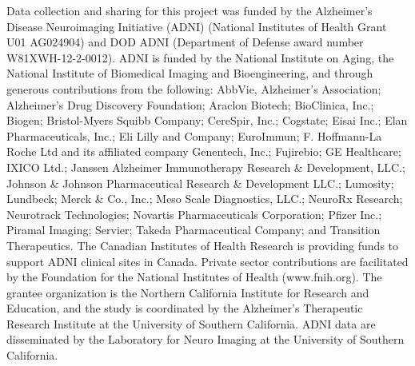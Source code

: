 \documentclass[12pt]{article}
\begin{document}
Data collection and sharing for this project was funded by the
Alzheimer's Disease Neuroimaging Initiative (ADNI) (National Institutes
of Health Grant U01 AG024904) and DOD ADNI (Department of Defense award
number W81XWH-12-2-0012). ADNI is funded by the National Institute on
Aging, the National Institute of Biomedical Imaging and Bioengineering,
and through generous contributions from the following: AbbVie,
Alzheimer's Association; Alzheimer's Drug Discovery Foundation; Araclon
Biotech; BioClinica, Inc.; Biogen; Bristol-Myers Squibb Company;
CereSpir, Inc.; Cogstate; Eisai Inc.; Elan Pharmaceuticals, Inc.; Eli
Lilly and Company; EuroImmun; F. Hoffmann-La Roche Ltd and its
affiliated company Genentech, Inc.; Fujirebio; GE Healthcare; IXICO
Ltd.; Janssen Alzheimer Immunotherapy Research \& Development, LLC.;
Johnson \& Johnson Pharmaceutical Research \& Development LLC.;
Lumosity; Lundbeck; Merck \& Co., Inc.; Meso Scale Diagnostics, LLC.;
NeuroRx Research; Neurotrack Technologies; Novartis Pharmaceuticals
Corporation; Pfizer Inc.; Piramal Imaging; Servier; Takeda
Pharmaceutical Company; and Transition Therapeutics. The Canadian
Institutes of Health Research is providing funds to support ADNI
clinical sites in Canada. Private sector contributions are facilitated
by the Foundation for the National Institutes of Health (www.fnih.org).
The grantee organization is the Northern California Institute for
Research and Education, and the study is coordinated by the Alzheimer's
Therapeutic Research Institute at the University of Southern California.
ADNI data are disseminated by the Laboratory for Neuro Imaging at the
University of Southern California.



\end{document}
